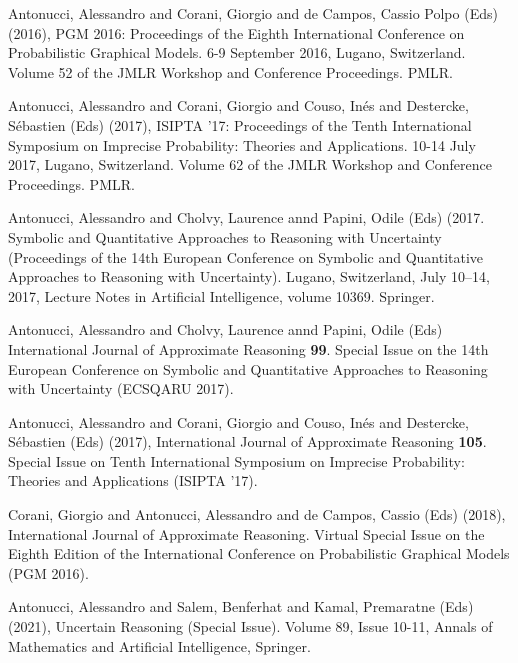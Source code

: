 \begin{cventries}
\begin{cvitems}
\item Antonucci, Alessandro and Corani, Giorgio and de Campos, Cassio Polpo (Eds) (2016), PGM 2016: Proceedings of the Eighth International Conference on Probabilistic Graphical Models. 6-9 September 2016, Lugano, Switzerland. Volume 52 of the JMLR Workshop and Conference Proceedings. PMLR.
\item Antonucci, Alessandro and Corani, Giorgio and Couso, Inés and Destercke, Sébastien (Eds) (2017), ISIPTA '17: Proceedings of the Tenth International Symposium on Imprecise Probability: Theories and Applications. 10-14 July 2017, Lugano, Switzerland. Volume 62 of the JMLR Workshop and Conference Proceedings. PMLR.
\item Antonucci, Alessandro and Cholvy, Laurence annd Papini, Odile (Eds) (2017. Symbolic and Quantitative Approaches to Reasoning with Uncertainty (Proceedings of the 14th European Conference on Symbolic and Quantitative Approaches to Reasoning with Uncertainty). Lugano, Switzerland, July 10–14, 2017, Lecture Notes in Artificial Intelligence, volume 10369. Springer.
\item Antonucci, Alessandro and Cholvy, Laurence annd Papini, Odile (Eds) International Journal of Approximate Reasoning {\bf{99}}. Special Issue on the 14th European Conference on Symbolic and Quantitative Approaches to Reasoning with Uncertainty (ECSQARU 2017).
\item Antonucci, Alessandro and Corani, Giorgio and Couso, Inés and Destercke, Sébastien (Eds) (2017), International Journal of Approximate Reasoning {\bf{105}}. Special Issue on Tenth International Symposium on Imprecise Probability: Theories and Applications (ISIPTA ’17).
\item Corani, Giorgio and Antonucci, Alessandro and de Campos, Cassio (Eds) (2018), International Journal of Approximate Reasoning. Virtual Special Issue on the Eighth Edition of the International Conference on Probabilistic Graphical Models (PGM 2016).
\item Antonucci, Alessandro and Salem, Benferhat and Kamal, Premaratne (Eds) (2021), 
Uncertain Reasoning (Special Issue). Volume 89, Issue 10-11, Annals of Mathematics and Artificial Intelligence, Springer.
\end{cvitems}
\end{cventries}
